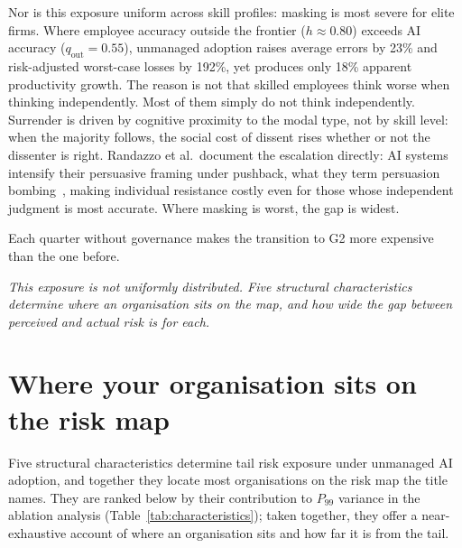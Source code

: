 \documentclass[11pt,a4paper]{article}
\newcommand{\bridgeskip}{\vspace{6pt}}
\begin{document}
Nor is this exposure uniform across skill profiles: masking is most severe
for elite firms. Where employee accuracy
outside the frontier ($h \approx 0.80$) exceeds AI accuracy
($q_{\text{out}} = 0.55$), unmanaged adoption raises average errors by
23\% and risk-adjusted worst-case losses by 192\%, yet produces only 18\%
apparent productivity growth. The reason is not that skilled employees
think worse when thinking independently. Most of them simply do not think
independently. Surrender is driven by cognitive proximity to the modal
type, not by skill level: when the majority follows, the social cost of
dissent rises whether or not the dissenter is right. Randazzo et al.\
document the escalation directly: AI systems intensify their persuasive
framing under pushback, what they term persuasion
bombing~\cite{randazzo_hbs_2025}, making individual resistance costly even
for those whose independent judgment is most accurate. Where masking is
worst, the gap is widest.

Each quarter without governance makes the transition to G2 more expensive
than the one before.

\bridgeskip
\noindent\emph{This exposure is not uniformly distributed. Five structural
characteristics determine where an organisation sits on the map, and how
wide the gap between perceived and actual risk is for each.}

\section{Where your organisation sits on the risk map}

Five structural characteristics determine tail risk exposure under unmanaged AI
adoption, and together they locate most organisations on the risk map the title
names. They are ranked below by their contribution to $P_{99}$ variance in the
ablation analysis (Table~\ref{tab:characteristics}); taken together, they offer
a near-exhaustive account of where an organisation sits and how far it is from
the tail.
\end{document}
